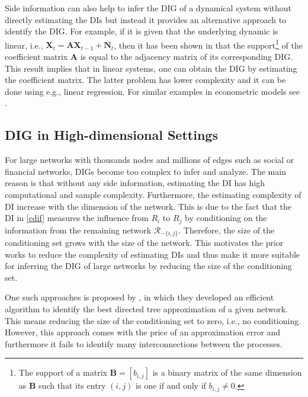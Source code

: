 Side information can also help to infer the DIG of a dynamical system without directly estimating the DIs but instead it provides an alternative approach to identify the DIG. 
For example, if it is given that the underlying dynamic is linear, i.e., $\textbf{X}_t = \textbf{AX}_{t-1} + \textbf{N}_t$, then it has been shown in \citet{acc2014} that the support\footnote{The support of a matrix $\textbf{B}=[b_{i,j}]$ is a binary matrix of the same dimension as $\textbf{B}$ such that its entry $(i,j)$ is one if and only if $b_{i,j}\neq0$.} of the coefficient matrix $\textbf{A}$ is equal to the adjacency matrix of its corresponding DIG.   
This result implies that in linear systems, one can obtain the DIG by estimating the coefficient matrix. The latter problem has lower complexity and it can be done using e.g., linear regression. 
For similar examples in econometric models see \citet{etesami2018econometric}.

  





\subsection{DIG in High-dimensional Settings}
For large networks with thousands nodes and millions of edges such as social or financial networks, DIGs become too complex to infer and analyze.
The main reason is that without any side information, estimating the DI has high computational and sample complexity. 
Furthermore, the estimating complexity of DI increase with the dimension of the network.
This is due to the fact that the DI in \eqref{cdif} measures the influence from $R_i$ to $R_j$ by conditioning on the information from the remaining network $\mathcal{R}_{-\{i,j\}}$. 
Therefore, the size of the conditioning set grows with the size of the network.
This motivates the prior works to reduce the complexity of estimating  DIs and thus make it more suitable for inferring the DIG of large networks by reducing the size of the conditioning set. 


One such approaches is proposed by \citet{quinn2013efficient}, in which they developed an efficient algorithm to identify the best directed tree approximation of a given network.
This means reducing the size of the conditioning set to zero, i.e., no conditioning.  
However, this approach comes with the price of an approximation error and furthermore it fails to identify many interconnections between the processes. 

